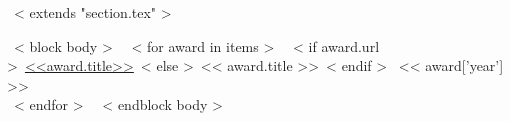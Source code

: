 ~< extends "section.tex" >~

~< block body >~
~< for award in items >~
  ~< if award.url >~\href{<<award.url>>}{<<award.title>>}~< else >~<< award.title >>~< endif >~
  \hfill << award['year'] >> \\
~< endfor >~
~< endblock body >~
